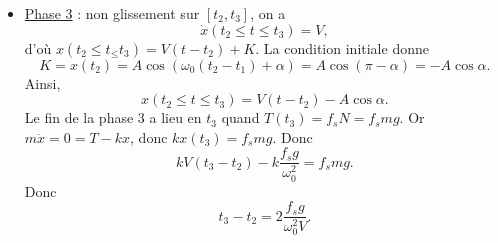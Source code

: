 \begin{itemize}
            \item \underline{Phase 3} : non glissement sur $[t_2,t_3]$, on a 
            \begin{equation}
                \dot{x}(t_2\leqslant t\leqslant t_3)=V,
            \end{equation}
            d'où $x(t_2\leqslant t_\leqslant t_3)=V(t-t_2)+K$. La condition initiale donne
            \begin{equation}
                K=x(t_2)=A\cos\left(\omega_0(t_2-t_1)+\alpha\right)=A\cos\left(\pi-\alpha\right)=-A\cos\alpha.
            \end{equation}
            Ainsi,
            \begin{equation}
                x(t_2\leqslant t\leqslant t_3)=V(t-t_2)-A\cos\alpha.
            \end{equation}
            Le fin de la phase 3 a lieu en $t_3$ quand $T(t_3)=f_s N=f_s mg$. Or $m\ddot{x}=0=T-kx$, donc $kx(t_3)=f_s mg$. Donc
            \begin{equation}
                kV(t_3-t_2)-k\frac{f_s g}{\omega_0^{2}}=f_s mg.
            \end{equation}
            Donc 
            \begin{equation}
                t_3-t_2=2\frac{f_s g}{\omega_0^{2}V}.
            \end{equation}
        \end{itemize}





